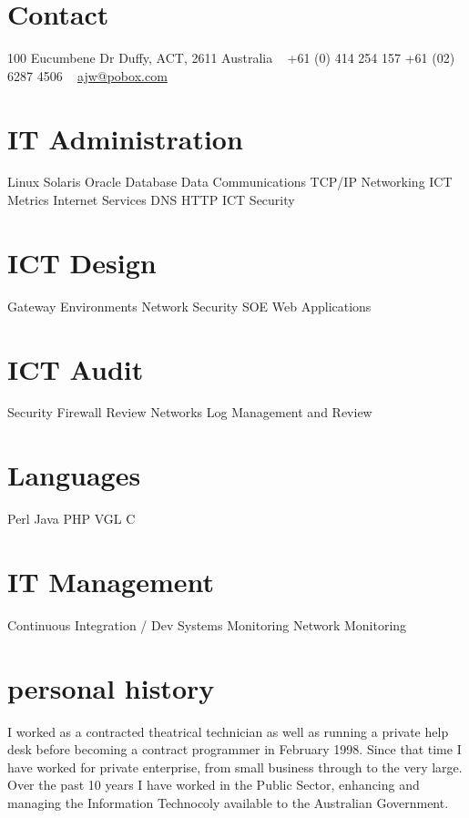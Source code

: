 \documentclass[]{friggeri-cv} %
\begin{document}


\begin{aside} %
\section{Contact}
100 Eucumbene Dr
Duffy, ACT, 2611
Australia
~
+61 (0) 414 254 157
+61 (02) 6287 4506
~
\href{mailto:ajw@pobox.com}{ajw@pobox.com}
\section{IT Administration}
Linux
Solaris
Oracle Database
Data Communications
TCP/IP Networking
ICT Metrics
Internet Services
DNS
HTTP
ICT Security
\section{ICT Design}
Gateway Environments
Network
Security
SOE
Web Applications
\section{ICT Audit}
Security
Firewall Review
Networks
Log Management and Review
\section{Languages}
Perl
Java
PHP
VGL
C
\section{IT Management}
Continuous Integration / Dev
Systems Monitoring
Network Monitoring
\end{aside}

\section{personal history}
I worked as a contracted theatrical technician as well as running a private help desk before becoming a contract programmer in February 1998. Since that time I have worked for private enterprise, from small business through to the very large. Over the past 10 years I have worked in the Public Sector, enhancing and managing the Information Technocoly available to the Australian Government.
\end{document}
